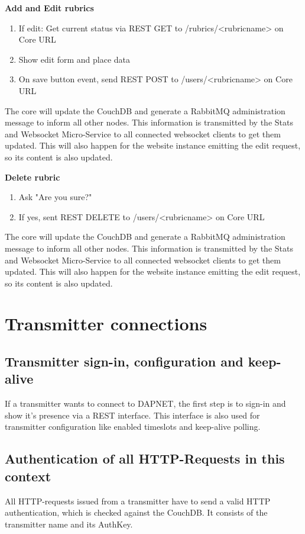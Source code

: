 \documentclass[a4paper]{article}
\begin{document}
\textbf{Add and Edit rubrics}
\begin{enumerate}
	\item If edit: Get current status via REST GET to /rubrics/<rubricname> on Core URL
	\item Show edit form and place data
	\item On save button event, send REST POST to /users/<rubricname> on Core URL
\end{enumerate}
The core will update the CouchDB and generate a RabbitMQ administration message to inform all other nodes. This information is transmitted by the Stats and Websocket Micro-Service to all connected websocket clients to get them updated. This will also happen for the website instance emitting the edit request, so its content is also updated.


\textbf{Delete rubric}
\begin{enumerate}
	\item Ask "Are you sure?"
	\item If yes, sent REST DELETE to /users/<rubricname> on Core URL
\end{enumerate}
The core will update the CouchDB and generate a RabbitMQ administration message to inform all other nodes. This information is transmitted by the Stats and Websocket Micro-Service to all connected websocket clients to get them updated. This will also happen for the website instance emitting the edit request, so its content is also updated.




\section{Transmitter connections}

\subsection{Transmitter sign-in, configuration and keep-alive}
If a transmitter wants to connect to DAPNET, the first step is to sign-in and show it's presence via a REST interface. This interface is also used for transmitter configuration like enabled timeslots and keep-alive polling.

\subsection{Authentication of all HTTP-Requests in this context}
All HTTP-requests issued from a transmitter have to send a valid HTTP authentication, which is checked against the CouchDB. It consists of the transmitter name and its AuthKey.
\end{document}

